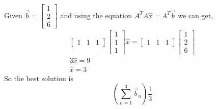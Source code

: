 				Given $\vec{b}=\begin{bmatrix}1 \\ 2 \\ 6\end{bmatrix}$ and using the equation $A^TA\hat{x}=A^T\vec{b}$ we can get, \newline
				    \begin{gather*}
				    \begin{bmatrix}1 & 1 & 1 \end{bmatrix}
				    \begin{bmatrix}1 \\ 1 \\ 1 \end{bmatrix}
				    \hat{x}=
				    \begin{bmatrix}1 & 1 & 1 \end{bmatrix}
				    \begin{bmatrix}1 \\ 2 \\ 6 \end{bmatrix}
				    \\
				    3\hat{x}=9
				    \\
				    \hat{x}=3
				    \end{gather*}
				    So the best solution is $$\left(\sum_{n=1}^3\vec{b}_n \right)\frac{1}{3}$$
